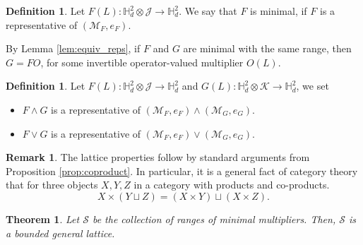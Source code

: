 \documentclass[11pt]{article}
\def\bH{\mathbb{H}}
\newcommand{\J}{\ensuremath{\mathcal{J} }}
\newcommand{\K}{\ensuremath{\mathcal{K} }}
\newcommand{\cS}{\ensuremath{\mathcal{S}}}
\newcommand{\sM}{\ensuremath{\mathscr{M}}}
\numberwithin{equation}{section}
\numberwithin{subsection}{section}
\newtheorem{thm}[subsection]{Theorem}
\theoremstyle{definition}
\newtheorem{defn}[subsection]{Definition}
\newtheorem{remark}[subsection]{Remark}
\begin{document}
\begin{defn}
Let $F(L) \colon \bH ^2_d \otimes \J \to \bH ^2_d$. We say that $F$ is minimal, if $F$ is a representative of $(\sM_F,e_F)$.
\end{defn}

By Lemma \ref{lem:equiv_reps}, if $F$ and $G$ are minimal with the same range, then $G = F O$, for some invertible operator-valued multiplier $O(L)$.

\begin{defn}
Let $F(L) \colon \bH ^2_d \otimes \J \to \bH ^2_d$ and $G(L) \colon \bH ^2_d \otimes \K \to \bH ^2_d$, we set 
\begin{itemize}
\item $F \wedge G$ is a representative of $(\sM_F,e_F) \wedge (\sM_G,e_G)$. 

\item $F \vee G$ is a representative of $(\sM_F,e_F) \vee (\sM_G,e_G)$.
\end{itemize}
\end{defn}

\begin{remark}
The lattice properties follow by standard arguments from Proposition \ref{prop:coproduct}. In particular, it is a general fact of category theory that for three objects $X,Y,Z$ in a category with products and co-products.
\[
X \times (Y \sqcup Z) = (X \times Y) \sqcup (X \times Z).
\]
\end{remark}

\begin{thm}
Let $\cS$ be the collection of ranges of minimal multipliers. Then, $\cS$ is a bounded general lattice.
\end{thm}




\end{document}
